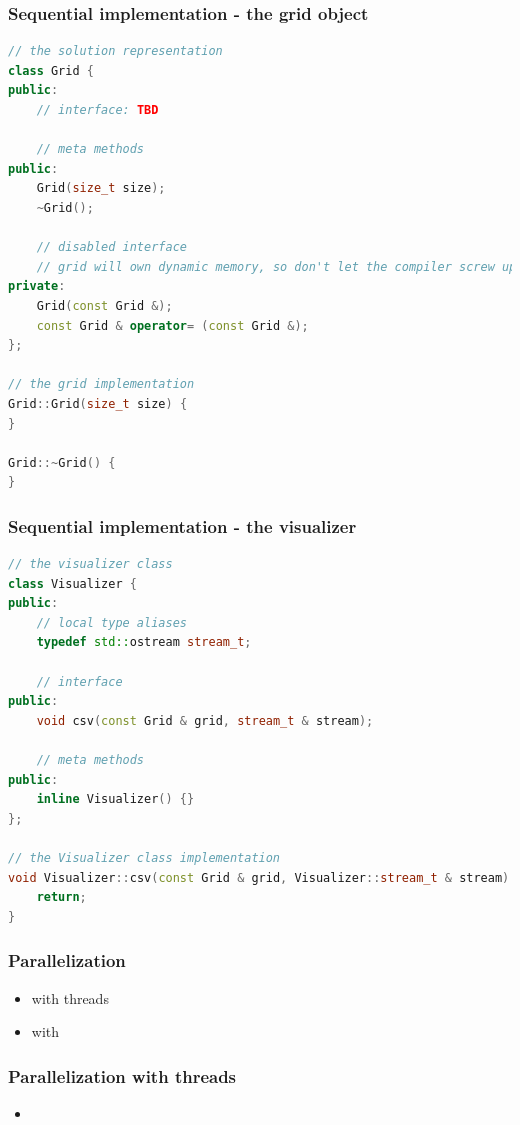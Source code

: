 \begin{frame}[fragile]
%
  \frametitle{Sequential implementation - the grid object}
%
  \begin{lstlisting}[language=c++,name=seq:frame]
// the solution representation
class Grid {
public:
    // interface: TBD

    // meta methods
public:
    Grid(size_t size);
    ~Grid();

    // disabled interface
    // grid will own dynamic memory, so don't let the compiler screw up
private:
    Grid(const Grid &);
    const Grid & operator= (const Grid &);
};

// the grid implementation
Grid::Grid(size_t size) {
}

Grid::~Grid() {
}

  \end{lstlisting}
% 
\end{frame}

\begin{frame}[fragile]
%
  \frametitle{Sequential implementation - the visualizer}
%
  \begin{lstlisting}[language=c++,name=seq:frame, firstnumber=1]
// the visualizer class
class Visualizer {
public:
    // local type aliases
    typedef std::ostream stream_t;

    // interface
public:
    void csv(const Grid & grid, stream_t & stream);

    // meta methods
public:
    inline Visualizer() {}
};

// the Visualizer class implementation
void Visualizer::csv(const Grid & grid, Visualizer::stream_t & stream) {
    return;
}

  \end{lstlisting}
% 
\end{frame}

\begin{frame}[fragile]
%
  \frametitle{Parallelization}
%
  \begin{itemize}
%
  \item with threads
  \item with \mpi
%
  \end{itemize}
% 
\end{frame}

\begin{frame}[fragile]
%
  \frametitle{Parallelization with threads}
%
  \begin{itemize}
%
  \item
% 
  \end{itemize}
%
\end{frame}


